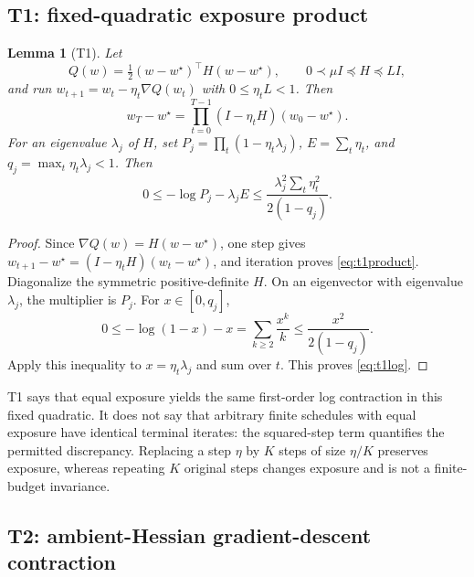 \documentclass{article}
\newtheorem{lemma}{Lemma}
\begin{document}
\subsection{T1: fixed-quadratic exposure product}
\label{sec:t1}

\begin{lemma}[T1]
\label{thm:t1}
Let
\[
 Q(w)=\tfrac12(w-w^\star)^\top H(w-w^\star),\qquad
 0\prec\mu I\preceq H\preceq LI,
\]
and run $w_{t+1}=w_t-\eta_t\nabla Q(w_t)$ with
$0\leq\eta_tL<1$. Then
\begin{equation}
 w_T-w^\star=\prod_{t=0}^{T-1}(I-\eta_tH)(w_0-w^\star).
\label{eq:t1product}
\end{equation}
For an eigenvalue $\lambda_j$ of $H$, set
$P_j=\prod_t(1-\eta_t\lambda_j)$,
$E=\sum_t\eta_t$, and $q_j=\max_t\eta_t\lambda_j<1$. Then
\begin{equation}
 0\leq-\log P_j-\lambda_jE
 \leq\frac{\lambda_j^2\sum_t\eta_t^2}{2(1-q_j)}.
\label{eq:t1log}
\end{equation}
\end{lemma}

\begin{proof}
Since $\nabla Q(w)=H(w-w^\star)$, one step gives
$w_{t+1}-w^\star=(I-\eta_tH)(w_t-w^\star)$, and iteration proves
\eqref{eq:t1product}. Diagonalize the symmetric positive-definite $H$.
On an eigenvector with eigenvalue $\lambda_j$, the multiplier is $P_j$.
For $x\in[0,q_j]$,
\[
 0\leq-\log(1-x)-x
   =\sum_{k\geq2}\frac{x^k}{k}
 \leq\frac{x^2}{2(1-q_j)}.
\]
Apply this inequality to $x=\eta_t\lambda_j$ and sum over $t$.
This proves \eqref{eq:t1log}.
\end{proof}

T1 says that equal exposure yields the same first-order log contraction in
this fixed quadratic. It does not say that arbitrary finite schedules with
equal exposure have identical terminal iterates: the squared-step term
quantifies the permitted discrepancy. Replacing a step $\eta$ by $K$ steps of
size $\eta/K$ preserves exposure, whereas repeating $K$ original steps changes
exposure and is not a finite-budget invariance.

\subsection{T2: ambient-Hessian gradient-descent contraction}
\label{sec:t2}
\end{document}
